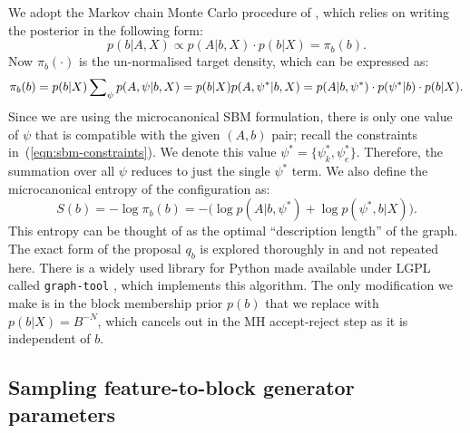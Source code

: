 We adopt the Markov chain Monte Carlo procedure of
\cite{Peixoto-MCMC},
which relies on writing the posterior in the following form:
%
\begin{equation}
	p(b | A, X) \propto p(A | b, X) \cdot p(b | X) = \pi_b(b).
\end{equation}
%
Now $\pi_b(\cdot)$ is the un-normalised target density,
which can be expressed as:
%
\begin{equation}
	\pi_b(b) = p(b|X) \sum_{\psi} \nolimits p(A , \psi | b, X) \\
	= p(b|X) p(A, \psi^* | b, X) \\
	= p(A | b, \psi^*) \cdot p(\psi^* | b) \cdot p(b | X).
\end{equation}
%
Since we are using the microcanonical SBM formulation, there is only one 
value of $\psi$ that is compatible with the given $(A, b)$ pair;
recall the constraints in~(\ref{eqn:sbm-constraints}). 
We denote this value $\psi^* = \{\psi_k^*, \psi_e^*\}$. Therefore, 
the summation over all $\psi$ reduces to just the single $\psi^*$ term.
We also define the microcanonical entropy of the configuration as:
%
\begin{equation}
	S(b) = - \log \pi_b(b) = - \Big( \log p(A | b, \psi^*) + \log p(\psi^*, b | X) \Big).
	\label{eqn:dl-form}
\end{equation}
%
This entropy can be thought of as the optimal
``description length'' of the graph. 
The exact form of the proposal $q_b$ is explored thoroughly in
\cite{Peixoto-MCMC} and not repeated here. There is a widely used 
library for Python made available under LGPL 
called \verb*|graph-tool| \cite{peixoto_graph-tool_2014}, 
which implements this algorithm. The only modification we make is in 
the block membership prior $p(b)$ that we replace with $p(b|X)=B^{-N}$, 
which cancels out in the MH accept-reject step as it is independent of $b$.

\subsection{Sampling feature-to-block generator parameters}
\label{s:sfb}

